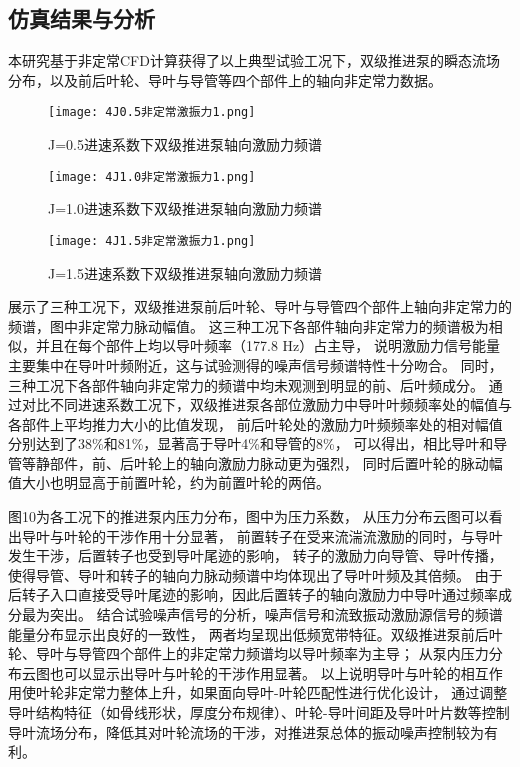 \subsection{仿真结果与分析}
本研究基于非定常CFD计算获得了以上典型试验工况下，双级推进泵的瞬态流场分布，以及前后叶轮、导叶与导管等四个部件上的轴向非定常力数据。
\begin{figure}[htbp]
    \centering
    \texttt{[image: 4J0.5非定常激振力1.png]}
    \caption{\label{fig:jisuanyuwangge}J=0.5进速系数下双级推进泵轴向激励力频谱}
\end{figure}
\begin{figure}[htbp]
    \centering
    \texttt{[image: 4J1.0非定常激振力1.png]}
    \caption{\label{fig:jisuanyuwangge}J=1.0进速系数下双级推进泵轴向激励力频谱}
\end{figure}
\begin{figure}[htbp]
    \centering
    \texttt{[image: 4J1.5非定常激振力1.png]}
    \caption{\label{fig:jisuanyuwangge}J=1.5进速系数下双级推进泵轴向激励力频谱}
\end{figure}

展示了三种工况下，双级推进泵前后叶轮、导叶与导管四个部件上轴向非定常力的频谱，图中非定常力脉动幅值。
这三种工况下各部件轴向非定常力的频谱极为相似，并且在每个部件上均以导叶频率（177.8 Hz）占主导，
说明激励力信号能量主要集中在导叶叶频附近，这与试验测得的噪声信号频谱特性十分吻合。
同时，三种工况下各部件轴向非定常力的频谱中均未观测到明显的前、后叶频成分。
通过对比不同进速系数工况下，双级推进泵各部位激励力中导叶叶频频率处的幅值与各部件上平均推力大小的比值发现，
前后叶轮处的激励力叶频频率处的相对幅值分别达到了38\%和81\%，显著高于导叶4\%和导管的8\%，
可以得出，相比导叶和导管等静部件，前、后叶轮上的轴向激励力脉动更为强烈，
同时后置叶轮的脉动幅值大小也明显高于前置叶轮，约为前置叶轮的两倍。

图10为各工况下的推进泵内压力分布，图中为压力系数，
从压力分布云图可以看出导叶与叶轮的干涉作用十分显著，
前置转子在受来流湍流激励的同时，与导叶发生干涉，后置转子也受到导叶尾迹的影响，
转子的激励力向导管、导叶传播，使得导管、导叶和转子的轴向力脉动频谱中均体现出了导叶叶频及其倍频。
由于后转子入口直接受导叶尾迹的影响，因此后置转子的轴向激励力中导叶通过频率成分最为突出。
结合试验噪声信号的分析，噪声信号和流致振动激励源信号的频谱能量分布显示出良好的一致性，
两者均呈现出低频宽带特征。双级推进泵前后叶轮、导叶与导管四个部件上的非定常力频谱均以导叶频率为主导；
从泵内压力分布云图也可以显示出导叶与叶轮的干涉作用显著。
以上说明导叶与叶轮的相互作用使叶轮非定常力整体上升，如果面向导叶-叶轮匹配性进行优化设计，
通过调整导叶结构特征（如骨线形状，厚度分布规律）、叶轮-导叶间距及导叶叶片数等控制导叶流场分布，降低其对叶轮流场的干涉，对推进泵总体的振动噪声控制较为有利。



